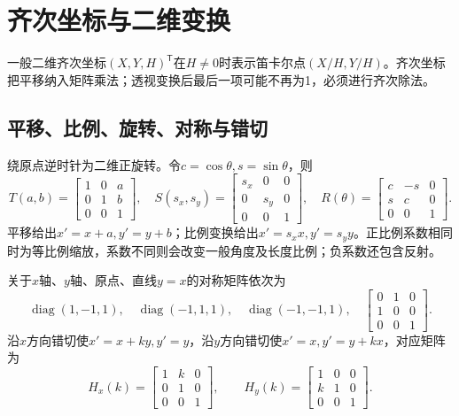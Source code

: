 \section{齐次坐标与二维变换}
\label{sec:homogeneous}

一般二维齐次坐标$(X,Y,H)^{\mathsf T}$在$H\ne0$时表示笛卡尔点$(X/H,Y/H)$。齐次坐标把平移纳入矩阵乘法；透视变换后最后一项可能不再为1，必须进行齐次除法。

\subsection{平移、比例、旋转、对称与错切}
绕原点逆时针为二维正旋转。令$c=\cos\theta,s=\sin\theta$，则
\[
T(a,b)=\begin{bmatrix}1&0&a\\0&1&b\\0&0&1\end{bmatrix},\quad
S(s_x,s_y)=\begin{bmatrix}s_x&0&0\\0&s_y&0\\0&0&1\end{bmatrix},\quad
R(\theta)=\begin{bmatrix}c&-s&0\\s&c&0\\0&0&1\end{bmatrix}.
\]
平移给出$x'=x+a,y'=y+b$；比例变换给出$x'=s_xx,y'=s_yy$。正比例系数相同时为等比例缩放，系数不同则会改变一般角度及长度比例；负系数还包含反射。

关于$x$轴、$y$轴、原点、直线$y=x$的对称矩阵依次为
\[
\operatorname{diag}(1,-1,1),\quad
\operatorname{diag}(-1,1,1),\quad
\operatorname{diag}(-1,-1,1),\quad
\begin{bmatrix}0&1&0\\1&0&0\\0&0&1\end{bmatrix}.
\]
沿$x$方向错切使$x'=x+ky,y'=y$，沿$y$方向错切使$x'=x,y'=y+kx$，对应矩阵为
\[
H_x(k)=\begin{bmatrix}1&k&0\\0&1&0\\0&0&1\end{bmatrix},\qquad
H_y(k)=\begin{bmatrix}1&0&0\\k&1&0\\0&0&1\end{bmatrix}.
\]

